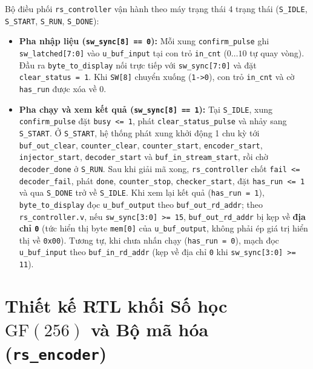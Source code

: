 \documentclass[11pt,a4paper]{report}
\begin{document}
Bộ điều phối \texttt{rs\_controller} vận hành theo máy trạng thái 4 trạng thái (\texttt{S\_IDLE}, \texttt{S\_START}, \texttt{S\_RUN}, \texttt{S\_DONE}):
\begin{itemize}
    \item \textbf{Pha nhập liệu (\texttt{sw\_sync[8] == 0}):} Mỗi xung \texttt{confirm\_\allowbreak pulse} ghi \texttt{sw\_\allowbreak latched[7:0]} vào \texttt{u\_buf\_\allowbreak input} tại con trỏ \texttt{in\_cnt} ($0\dots 10$ tự quay vòng). Đầu ra \texttt{byte\_to\_display} nối trực tiếp với \texttt{sw\_sync[7:0]} và đặt \texttt{clear\_status = 1}. Khi \texttt{SW[8]} chuyển xuống (\texttt{1->0}), con trỏ \texttt{in\_cnt} và cờ \texttt{has\_run} được xóa về 0.
    \item \textbf{Pha chạy và xem kết quả (\texttt{sw\_sync[8] == 1}):} Tại \texttt{S\_IDLE}, xung \texttt{confirm\_\allowbreak pulse} đặt \texttt{busy <= 1}, phát \texttt{clear\_status\_\allowbreak pulse} và nhảy sang \texttt{S\_START}. Ở \texttt{S\_START}, hệ thống phát xung khởi động 1 chu kỳ tới \texttt{buf\_out\_clear}, \texttt{counter\_clear}, \texttt{counter\_start}, \texttt{encoder\_start}, \texttt{injector\_start}, \texttt{decoder\_start} và \texttt{buf\_in\_\allowbreak stream\_start}, rồi chờ \texttt{decoder\_done} ở \texttt{S\_RUN}. Sau khi giải mã xong, \texttt{rs\_\allowbreak controller} chốt \texttt{fail <= decoder\_fail}, phát \texttt{done}, \texttt{counter\_stop}, \texttt{checker\_start}, đặt \texttt{has\_\allowbreak run <= 1} và qua \texttt{S\_DONE} trở về \texttt{S\_IDLE}. Khi xem lại kết quả (\texttt{has\_run = 1}), \texttt{byte\_to\_display} đọc \texttt{u\_buf\_\allowbreak output} theo \texttt{buf\_out\_\allowbreak rd\_addr}; theo \texttt{rs\_\allowbreak controller.v}, nếu \texttt{sw\_sync[3:0] >= 15}, \texttt{buf\_out\_\allowbreak rd\_addr} bị kẹp về \textbf{địa chỉ \texttt{0}} (tức hiển thị byte \texttt{mem[0]} của \texttt{u\_buf\_output}, không phải ép giá trị hiển thị về \texttt{0x00}). Tương tự, khi chưa nhấn chạy (\texttt{has\_run = 0}), mạch đọc \texttt{u\_buf\_input} theo \texttt{buf\_in\_\allowbreak rd\_addr} (kẹp về địa chỉ \texttt{0} khi \texttt{sw\_sync[3:0] >= 11}).
\end{itemize}

\section{Thiết kế RTL khối Số học \texorpdfstring{$\text{GF}(256)$}{GF(256)} và Bộ mã hóa (\texttt{rs\_encoder})}
\label{sec:gf-encoder}
\end{document}
